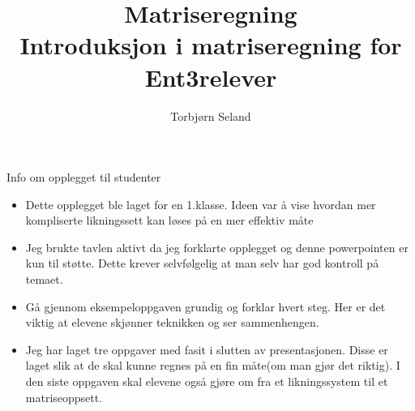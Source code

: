 \documentclass[norsk]{beamer}
\title[Løse likningssett med matriseregning]{Matriseregning\\ Introduksjon i matriseregning for Ent3relever}
\author{Torbjørn Seland}
\begin{document}
\begin{frame}
\titlepage
\end{frame}

\begin{frame}{Info om opplegget til studenter}
\begin{itemize}
	\item Dette opplegget ble laget for en 1.klasse. Ideen var å vise hvordan
		mer kompliserte likningssett kan løses på en mer effektiv måte
	\item Jeg brukte tavlen aktivt da jeg forklarte opplegget og denne
		powerpointen er kun til støtte. Dette krever selvfølgelig at man selv
		har god kontroll på temaet.
	\item Gå gjennom eksempeloppgaven grundig og forklar hvert steg. Her er det
		viktig at elevene skjønner teknikken og ser sammenhengen.
	\item Jeg har laget tre oppgaver med fasit i slutten av presentasjonen.
		Disse er laget slik at de skal kunne regnes på en fin måte(om man gjør
		det riktig). I den siste oppgaven skal elevene også gjøre om fra et
		likningssystem til et matriseoppsett.
\end{itemize}
\end{frame}
\end{document}
